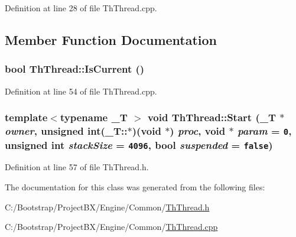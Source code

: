 Definition at line 28 of file ThThread.cpp.

\subsection{Member Function Documentation}
\hypertarget{class_th_thread_fe2840d32112d45a88175e81dc6d6e68}{
\subsubsection[{IsCurrent}]{\setlength{\rightskip}{0pt plus 5cm}bool ThThread::IsCurrent ()}}
\label{class_th_thread_fe2840d32112d45a88175e81dc6d6e68}




Definition at line 54 of file ThThread.cpp.\hypertarget{class_th_thread_04873bccc79605fc5c35da85464e7191}{
\subsubsection[{Start}]{\setlength{\rightskip}{0pt plus 5cm}template$<$typename \_\-T $>$ void ThThread::Start (\_\-T $\ast$ {\em owner}, \/  unsigned int(\_\-T::$\ast$)(void $\ast$) {\em proc}, \/  void $\ast$ {\em param} = {\tt 0}, \/  unsigned int {\em stackSize} = {\tt 4096}, \/  bool {\em suspended} = {\tt false})}}
\label{class_th_thread_04873bccc79605fc5c35da85464e7191}




Definition at line 57 of file ThThread.h.

The documentation for this class was generated from the following files:\begin{CompactItemize}
\item 
C:/Bootstrap/ProjectBX/Engine/Common/\hyperlink{_th_thread_8h}{ThThread.h}\item 
C:/Bootstrap/ProjectBX/Engine/Common/\hyperlink{_th_thread_8cpp}{ThThread.cpp}\end{CompactItemize}
